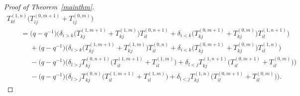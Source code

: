 \begin{proof}[Proof of Theorem~\ref{mainthm}]
\begin{gather*}
T_{kl}^{(1,n)} \big(T_{ij}^{(0,m+1)} + T_{ij}^{(0,m)}\big)
\\
\qquad
  = \big(q-q^{-1}\big) \Big(\delta_{i>k} \big(T_{kj}^{(1,m+1)} + T_{kj}^{(1,m)}\big) T_{il}^{(0,n+1)} + \delta_{i<k}
\big(T_{kj}^{(0,m+1)} + T_{kj}^{(0,m)}\big) T_{il}^{(1,n+1)} \Big)
\\
\qquad\phantom{=}{}
+ \big(q-q^{-1}\big) \Big(\delta_{i>k} \big(T_{kj}^{(1,m+1)} + T_{kj}^{(1,m)}\big) T_{il}^{(0,n)} + \delta_{i<k}
\big(T_{kj}^{(0,m+1)} + T_{kj}^{(0,m)}\big) T_{il}^{(1,n)}\Big)
\\
\qquad\phantom{=}{}
- \big(q-q^{-1}\big) \Big(\delta_{l>j} T_{kj}^{(0,n+1)} \big(T_{il}^{(1,m+1)} + T_{il}^{(1,m)}\big) + \delta_{l<j}
T_{kj}^{(1,n+1)} \big(T_{il}^{(0,m+1)} + T_{il}^{(0,m)}\big) \Big)
\\
\qquad\phantom{=}{}
- \big(q-q^{-1}\big) \Big(\delta_{l>j} T_{kj}^{(0,n)} \big(T_{il}^{(1,m+1)} + T_{il}^{(1,m)}\big) + \delta_{l<j} T_{kj}^{(1,n)}
\big(T_{il}^{(0,m+1)} + T_{il}^{(0,m)}\big) \Big).
\end{gather*}


\end{proof}
